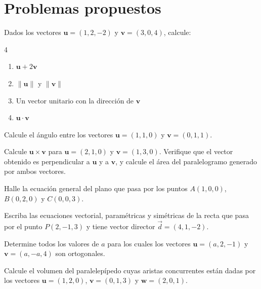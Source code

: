 \section{Problemas propuestos}

\begin{prob}
Dados los vectores $\mathbf{u}=(1,2,-2)$ y $\mathbf{v}=(3,0,4)$, calcule:
\begin{multicols}{4}
\begin{enumerate}[$a)$]
\item $\mathbf{u}+2\mathbf{v}$
\item $\|\mathbf{u}\|$ y $\|\mathbf{v}\|$
\item Un vector unitario con la dirección de $\mathbf{v}$
\item $\mathbf{u}\cdot\mathbf{v}$
\end{enumerate}
\end{multicols}
\end{prob}

\begin{prob}
Calcule el ángulo entre los vectores $\mathbf{u}=(1,1,0)$ y $\mathbf{v}=(0,1,1)$.
\end{prob}

\begin{prob}
Calcule $\mathbf{u}\times\mathbf{v}$ para $\mathbf{u}=(2,1,0)$ y $\mathbf{v}=(1,3,0)$. Verifique que el vector obtenido es perpendicular a $\mathbf{u}$ y a $\mathbf{v}$, y calcule el área del paralelogramo generado por ambos vectores.
\end{prob}

\begin{prob}
Halle la ecuación general del plano que pasa por los puntos $A(1,0,0)$, $B(0,2,0)$ y $C(0,0,3)$.
\end{prob}

\begin{prob}
Escriba las ecuaciones vectorial, paramétricas y simétricas de la recta que pasa por el punto $P(2,-1,3)$ y tiene vector director $\vec{d}=(4,1,-2)$.
\end{prob}

\begin{prob}
Determine todos los valores de $a$ para los cuales los vectores $\mathbf{u}=(a,2,-1)$ y $\mathbf{v}=(a,-a,4)$ son ortogonales.
\end{prob}

\begin{prob}
Calcule el volumen del paralelepípedo cuyas aristas concurrentes están dadas por los vectores $\mathbf{u}=(1,2,0)$, $\mathbf{v}=(0,1,3)$ y $\mathbf{w}=(2,0,1)$.
\end{prob}

